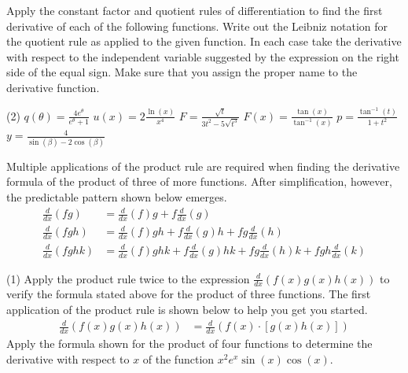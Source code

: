 \documentclass[10pt,oneside,]{book}
\theoremstyle{plain}
\theoremstyle{definition}
\numberwithin{equation}{section}
\newcommand{\fe}[2]{#1\mathopen{}\left(#2\right)\mathclose{}}
\newcommand{\lzoo}[2]{{\frac{d}{d#1}}{\left(#2\right)}}
\begin{document}
\par\smallskip\noindent
Apply the constant factor and quotient rules of differentiation to find the first derivative of each of the following functions.   Write out the Leibniz notation for the quotient rule as applied to the given function. In each case take the derivative with respect to the independent variable suggested by the expression on the right side of the equal sign.  Make sure that you assign the proper name to the derivative function.%
\par
\begin{exercisegroup}(2)
\exercise[13.]\hypertarget{exercise-413}{\null}\(\fe{q}{\theta}=\frac{4e^{\theta}}{e^\theta+1}\)%
\exercise[14.]\hypertarget{exercise-414}{\null}\(\fe{u}{x}=2\frac{\fe{\ln}{x}}{x^4}\)%
\exercise[15.]\hypertarget{exercise-415}{\null}\(F=\frac{\sqrt{t}}{3t^2-5\sqrt{t^3}}\)%
\exercise[16.]\hypertarget{exercise-416}{\null}\(\fe{F}{x}=\frac{\fe{\tan}{x}}{\fe{\tan^{-1}}{x}}\)%
\exercise[17.]\hypertarget{exercise-417}{\null}\(p=\frac{\fe{\tan^{-1}}{t}}{1+t^2}\)%
\exercise[18.]\hypertarget{exercise-418}{\null}\(y=\frac{4}{\fe{\sin}{\beta}-2\fe{\cos}{\beta}}\)%
\end{exercisegroup}
\par\smallskip\noindent
Multiple applications of the product rule are required when finding the derivative formula of the product of three of more functions.  After simplification, however, the predictable pattern shown below emerges.\begin{align*}
\lzoo{x}{fg}&=\lzoo{x}{f}g+f\lzoo{x}{g}\\
\lzoo{x}{fgh}&=\lzoo{x}{f}gh+f\lzoo{x}{g}h+fg\lzoo{x}{h}\\
\lzoo{x}{fghk}&=\lzoo{x}{f}ghk+f\lzoo{x}{g}hk+fg\lzoo{x}{h}k+fgh\lzoo{x}{k}
\end{align*}%
\par
\begin{exercisegroup}(1)
\exercise[19.]\hypertarget{exercise-419}{\null}Apply the product rule twice to the expression \(\lzoo{x}{\fe{f}{x}\fe{g}{x}\fe{h}{x}}\)  to verify the 
formula stated above for the product of three functions.  The first application of the product rule is shown below to help you get you started.\begin{align*}
\lzoo{x}{\fe{f}{x}\fe{g}{x}\fe{h}{x}}&=\lzoo{x}{\fe{f}{x}\cdot\left[\fe{g}{x}\fe{h}{x}\right]}
\end{align*}%
\exercise[20.]\hypertarget{exercise-420}{\null}Apply the formula shown for the product of four functions to determine the derivative with respect to \(x\) of the function \(x^2e^x\fe{\sin}{x}\fe{\cos}{x}\).%
\end{exercisegroup}
\end{document}
